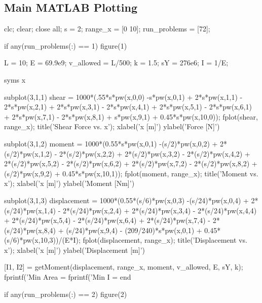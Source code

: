 \documentclass[a4paper]{article}
\begin{document}
\subsection{Main MATLAB Plotting}
\begin{verbatim*}

clc; clear; close all;
s = 2;
range_x = [0 10];
run_problems = [72];


if any(run_problems(:) == 1)
    figure(1)

    L = 10; %
    E = 69.9e9; %
    v_allowed = L/500; %
    k = 1.5; %
    sY = 276e6; %
    I = 1/E;

    syms x

    subplot(3,1,1)
    shear = 1000*(.55*s*pw(x,0,0) -s*pw(x,0,1) + 2*s*pw(x,1,1) - 2*s*pw(x,2,1) + 2*s*pw(x,3,1) - 2*s*pw(x,4,1) + 2*s*pw(x,5,1) - 2*s*pw(x,6,1) + 2*s*pw(x,7,1) - 2*s*pw(x,8,1) + s*pw(x,9,1) + 0.45*s*pw(x,10,0));
    fplot(shear, range_x);
    title('Shear Force vs. x');
    xlabel('x [m]')
    ylabel('Force [N]')

    subplot(3,1,2)
    moment = 1000*(0.55*s*pw(x,0,1) -(s/2)*pw(x,0,2) + 2*(s/2)*pw(x,1,2) - 2*(s/2)*pw(x,2,2) + 2*(s/2)*pw(x,3,2) - 2*(s/2)*pw(x,4,2) + 2*(s/2)*pw(x,5,2) - 2*(s/2)*pw(x,6,2) + 2*(s/2)*pw(x,7,2) - 2*(s/2)*pw(x,8,2) + (s/2)*pw(x,9,2) + 0.45*s*pw(x,10,1));
    fplot(moment, range_x);
    title('Moment vs. x');
    xlabel('x [m]')
    ylabel('Moment [Nm]')

    subplot(3,1,3)
    displacement = 1000*(0.55*(s/6)*pw(x,0,3) -(s/24)*pw(x,0,4) + 2*(s/24)*pw(x,1,4) - 2*(s/24)*pw(x,2,4) + 2*(s/24)*pw(x,3,4) - 2*(s/24)*pw(x,4,4) + 2*(s/24)*pw(x,5,4) - 2*(s/24)*pw(x,6,4) + 2*(s/24)*pw(x,7,4) - 2*(s/24)*pw(x,8,4) + (s/24)*pw(x,9,4) - (209/240)*s*pw(x,0,1) + 0.45*(s/6)*pw(x,10,3))/(E*I);
    fplot(displacement, range_x);
    title('Displacement vs. x');
    xlabel('x [m]')
    ylabel('Displacement [m]')


    [I1, I2] = getMoment(displacement, range_x, moment, v_allowed, E, sY, k);
    fprintf('Min Area = %
    fprintf('Min I = %
end



if any(run_problems(:) == 2)
    figure(2)


\end{verbatim*}
\end{document}
